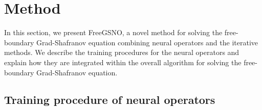 



\section{Method} \label{sec:4}

In this section, we present FreeGSNO, 
a novel method for solving the free-boundary Grad-Shafranov equation 
combining neural operators and the iterative methods.
We describe the training procedures for the neural operators and explain how they
are integrated within the overall algorithm for solving the free-boundary Grad-Shafranov equation. 

\subsection{Training procedure of neural operators}

